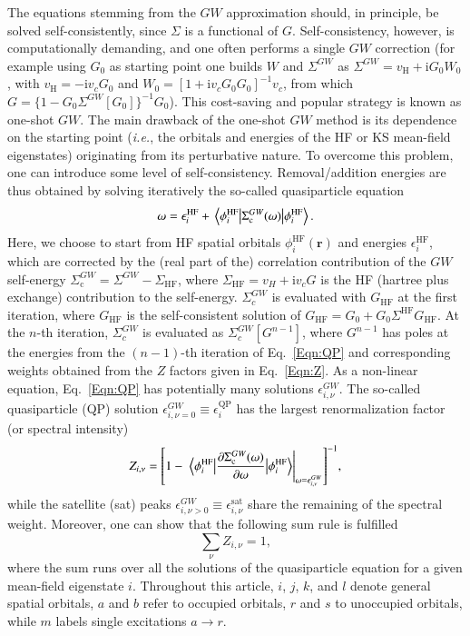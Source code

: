 \documentclass[aps,prb,reprint,superscriptaddress]{revtex4-1}
\newcommand{\br}{\boldsymbol{r}}
\newcommand{\eps}{\epsilon}
\newcommand{\MO}[1]{\phi_{#1}}
\newcommand{\ie}{\textit{i.e.}}
\newcommand{\I}{\text{i}}
\begin{document}
The equations stemming from the $GW$ approximation should, in principle, be solved self-consistently, since $\Sigma$ is a functional of $G$. \citep{Hedin_1965} Self-consistency, however, is computationally demanding, and one often performs a single $GW$ correction (for example using $G_0$ as starting point one builds $W$ and $\Sigma^{GW}$ as $\Sigma^{GW}=v_{\text{H}}+\I G_0W_0$, with $v_{\text{H}}=-\I v_cG_0$ and $W_0=[1+\I v_cG_0G_0]^{-1}v_c$, from which  $G=\{1-G_0\Sigma^{GW}[G_0]\}^{-1} G_0$). This cost-saving and popular strategy is known as one-shot $GW$. The main drawback of the one-shot $GW$ method is its dependence on the starting point (\ie, the orbitals and energies of the HF or KS mean-field eigenstates) originating from its perturbative nature. To overcome this problem, one can introduce some level of self-consistency. Removal/addition energies are thus obtained by solving iteratively the so-called quasiparticle equation
\begin{equation}
\label{Eqn:QP}
	\omega = \eps_i^\text{HF} + \mel{\MO{i}^\text{HF}}{\Sigma_\text{c}^{GW}(\omega)}{\MO{i}^\text{HF}}.
\end{equation}
Here, we choose to start from HF spatial orbitals $\MO{i}^\text{HF}(\br)$ and energies $\eps_i^{\text{HF}}$, which are corrected by the (real part of the) correlation contribution of the $GW$ self-energy $\Sigma^{GW}_\text{c}=\Sigma^{GW}-\Sigma_\text{HF}$, where $\Sigma_\text{HF}=v_H+\I v_c G$ is the HF (hartree plus exchange) contribution to the self-energy. $\Sigma^{GW}_c$ is evaluated with $G_{\text{HF}}$ at the first iteration, where $G_{\text{HF}}$ is the self-consistent solution of $G_{\text{HF}}=G_0+G_0\Sigma^{\text{HF}}G_{\text{HF}}$. At the $n$-th iteration, $\Sigma^{GW}_c$ is evaluated as $\Sigma^{GW}_c[G^{n-1}]$, where $G^{n-1}$ has poles at the energies from the $(n-1)$-th iteration of Eq.~\eqref{Eqn:QP} and corresponding weights obtained from the $Z$ factors given in Eq.~\eqref{Eqn:Z}.
As a non-linear equation, Eq.~\eqref{Eqn:QP} has potentially many solutions $\eps_{i,\nu}^{GW}$.
The  so-called quasiparticle (QP) solution $\eps_{i,\nu=0}^{GW} \equiv \eps_{i}^\text{QP}$ has the largest  renormalization factor (or spectral intensity)
\begin{equation}
\label{Eqn:Z}
	Z_{i,\nu} = \qty[ 1 - \left. \mel{\MO{i}^\text{HF}}{\pdv{\Sigma_{\text{c}}^{GW}(\omega)}{\omega}}{\MO{i}^\text{HF}} \right|_{\omega = \eps_{i,\nu}^{GW}} ]^{-1},
\end{equation}
while the satellite (sat) peaks $\eps_{i,\nu>0}^{GW} \equiv \eps_{i,\nu}^\text{sat}$ share the remaining of the spectral weight.
Moreover, one can show that the following sum rule is fulfilled \citep{vonBarth_1996}
\begin{equation}
\label{Eqn:Zsum}
	\sum_{\nu} Z_{i,\nu} = 1,
\end{equation}
where the sum runs over all the solutions of the quasiparticle equation for a given mean-field eigenstate $i$.
Throughout this article, $i$, $j$, $k$, and $l$ denote general spatial orbitals, $a$ and $b$ refer to occupied orbitals, $r$ and $s$ to unoccupied orbitals, while $m$ labels single excitations $a \to r$.
\end{document}
